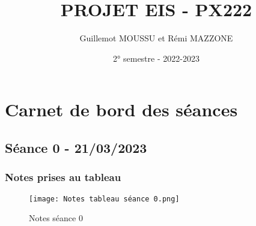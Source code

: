 \documentclass[11pt,a4paper]{article}
\title{PROJET EIS - PX222}
\author{Guillemot MOUSSU et Rémi MAZZONE}
\date{2° semestre - 2022-2023}
\begin{document}
\maketitle
\tableofcontents
\listoffigures
\pagebreak

\section{Carnet de bord des séances}
\subsection{Séance 0 - 21/03/2023}
\subsubsection{Notes prises au tableau}
\begin{figure} [H]
\texttt{[image: Notes tableau séance 0.png]} 
\caption{Notes séance 0}
\end{figure}
\end{document}
